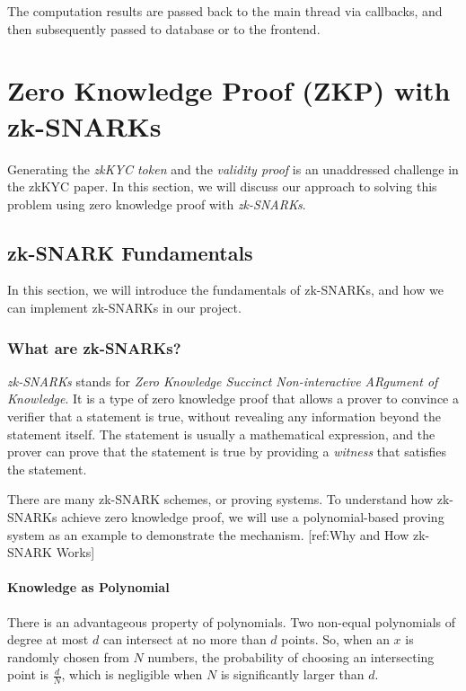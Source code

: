 \documentclass[
]{report}
\begin{document}
The computation results are passed back to the main thread via callbacks,
and then subsequently passed to database or to the frontend.

\chapter{Zero Knowledge Proof (ZKP) with zk-SNARKs}

Generating the \emph{zkKYC token} and the \emph{validity proof} is an
unaddressed challenge in the zkKYC paper. In this section, we will
discuss our approach to solving this problem using zero knowledge proof
with \emph{zk-SNARKs}.

\section{zk-SNARK Fundamentals}

In this section, we will introduce the fundamentals of zk-SNARKs, and
how we can implement zk-SNARKs in our project.

\subsection{What are zk-SNARKs?}

\emph{zk-SNARKs} stands for \emph{Zero Knowledge Succinct
Non-interactive ARgument of Knowledge}. It is a type of zero knowledge
proof that allows a prover to convince a verifier that a statement is
true, without revealing any information beyond the statement itself. The
statement is usually a mathematical expression, and the prover can prove
that the statement is true by providing a \emph{witness} that satisfies
the statement.

There are many zk-SNARK schemes, or proving systems. To understand how
zk-SNARKs achieve zero knowledge proof, we will use a polynomial-based
proving system as an example to demonstrate the mechanism.
{[}ref:Why and How zk-SNARK Works{]}

\subsubsection{Knowledge as Polynomial}

There is an advantageous property of polynomials. Two non-equal
polynomials of degree at most \(d\) can intersect at no more than \(d\)
points. So, when an \(x\) is randomly chosen from \(N\) numbers, the
probability of choosing an intersecting point is \(\frac{d}{N}\), which
is negligible when \(N\) is significantly larger than \(d\).
\end{document}
